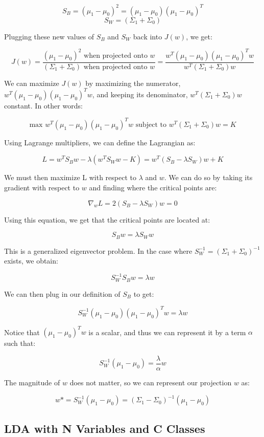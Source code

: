 \documentclass{article}
\begin{document}
$$S_B = (\mu_1-\mu_0)^2 = (\mu_1-\mu_0)(\mu_1-\mu_0)^T$$
$$S_W = (\Sigma_1+\Sigma_0)$$

Plugging these new values of $S_B$ and $S_W$ back into $J(w)$, we get:

$$J(w) = \frac{(\mu_1-\mu_0)^2\text{ when projected onto }w}{(\Sigma_1+\Sigma_0)\text{ when projected onto }w} = \frac{w^T(\mu_1-\mu_0)(\mu_1-\mu_0)^Tw}{w^T(\Sigma_1+\Sigma_0)w}$$ 

We can maximize $J(w)$ by maximizing the numerator, $w^T(\mu_1-\mu_0)(\mu_1-\mu_0)^Tw$, and keeping its denominator, $w^T(\Sigma_1+\Sigma_0)w$ constant. In other words:

$$\text{max }w^T(\mu_1-\mu_0)(\mu_1-\mu_0)^Tw\text{ subject to }w^T(\Sigma_1+\Sigma_0)w = K$$

Using Lagrange multipliers, we can define the Lagrangian as:

$$L = w^TS_Bw-\lambda(w^TS_Ww-K) = w^T(S_B-\lambda S_W)w+K$$

We must then maximize L with respect to $\lambda$ and $w$. We can do so by taking its gradient with respect to $w$ and finding where the critical points are:

$$\nabla_wL = 2(S_B-\lambda S_W)w = 0$$

Using this equation, we get that the critical points are located at:

$$S_Bw = \lambda S_Ww$$

This is a generalized eigenvector problem. In the case where $S_W^{-1} = (\Sigma_1 + \Sigma_0)^{-1}$ exists, we obtain:

$$S_W^{-1}S_Bw = \lambda w$$

We can then plug in our definition of $S_B$ to get:

$$S_W^{-1}(\mu_1-\mu_0)(\mu_1-\mu_0)^Tw = \lambda w$$

Notice that $(\mu_1-\mu_0)^Tw$ is a scalar, and thus we can represent it by a term $\alpha$ such that:

$$S_W^{-1}(\mu_1-\mu_0) = \frac{\lambda}{\alpha} w$$

The magnitude of $w$ does not matter, so we can represent our projection $w$ as:

$$w* = S_W^{-1}(\mu_1-\mu_0) = (\Sigma_1-\Sigma_0)^{-1}(\mu_1-\mu_0)$$


\subsection{LDA with N Variables and C Classes}
\end{document}
